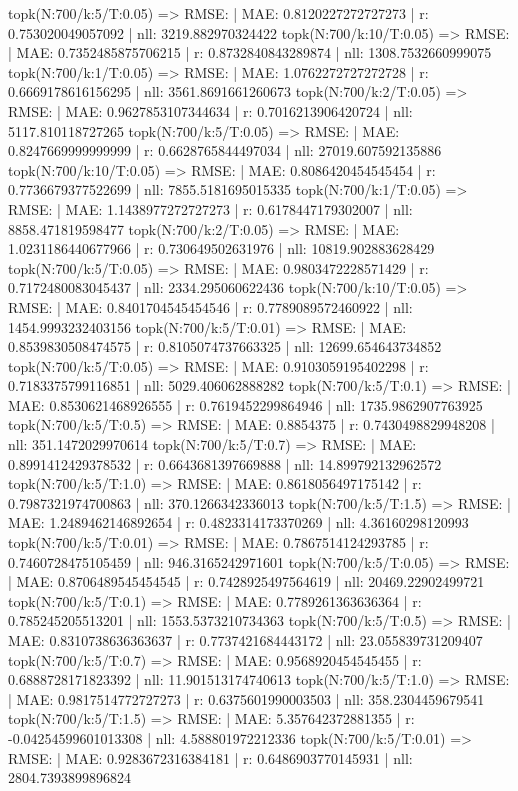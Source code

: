 topk(N:700/k:5/T:0.05) => RMSE: | MAE: 0.8120227272727273 | r: 0.753020049057092 | nll: 3219.882970324422
topk(N:700/k:10/T:0.05) => RMSE: | MAE: 0.7352485875706215 | r: 0.8732840843289874 | nll: 1308.7532660999075
topk(N:700/k:1/T:0.05) => RMSE: | MAE: 1.0762272727272728 | r: 0.6669178616156295 | nll: 3561.8691661260673
topk(N:700/k:2/T:0.05) => RMSE: | MAE: 0.9627853107344634 | r: 0.7016213906420724 | nll: 5117.810118727265
topk(N:700/k:5/T:0.05) => RMSE: | MAE: 0.8247669999999999 | r: 0.6628765844497034 | nll: 27019.607592135886
topk(N:700/k:10/T:0.05) => RMSE: | MAE: 0.8086420454545454 | r: 0.7736679377522699 | nll: 7855.5181695015335
topk(N:700/k:1/T:0.05) => RMSE: | MAE: 1.1438977272727273 | r: 0.6178447179302007 | nll: 8858.471819598477
topk(N:700/k:2/T:0.05) => RMSE: | MAE: 1.0231186440677966 | r: 0.730649502631976 | nll: 10819.902883628429
topk(N:700/k:5/T:0.05) => RMSE: | MAE: 0.9803472228571429 | r: 0.7172480083045437 | nll: 2334.295060622436
topk(N:700/k:10/T:0.05) => RMSE: | MAE: 0.8401704545454546 | r: 0.7789089572460922 | nll: 1454.9993232403156
topk(N:700/k:5/T:0.01) => RMSE: | MAE: 0.8539830508474575 | r: 0.8105074737663325 | nll: 12699.654643734852
topk(N:700/k:5/T:0.05) => RMSE: | MAE: 0.9103059195402298 | r: 0.7183375799116851 | nll: 5029.406062888282
topk(N:700/k:5/T:0.1) => RMSE: | MAE: 0.8530621468926555 | r: 0.7619452299864946 | nll: 1735.9862907763925
topk(N:700/k:5/T:0.5) => RMSE: | MAE: 0.8854375 | r: 0.7430498829948208 | nll: 351.1472029970614
topk(N:700/k:5/T:0.7) => RMSE: | MAE: 0.8991412429378532 | r: 0.6643681397669888 | nll: 14.899792132962572
topk(N:700/k:5/T:1.0) => RMSE: | MAE: 0.8618056497175142 | r: 0.7987321974700863 | nll: 370.1266342336013
topk(N:700/k:5/T:1.5) => RMSE: | MAE: 1.2489462146892654 | r: 0.4823314173370269 | nll: 4.36160298120993
topk(N:700/k:5/T:0.01) => RMSE: | MAE: 0.7867514124293785 | r: 0.7460728475105459 | nll: 946.3165242971601
topk(N:700/k:5/T:0.05) => RMSE: | MAE: 0.8706489545454545 | r: 0.7428925497564619 | nll: 20469.22902499721
topk(N:700/k:5/T:0.1) => RMSE: | MAE: 0.7789261363636364 | r: 0.785245205513201 | nll: 1553.5373210734363
topk(N:700/k:5/T:0.5) => RMSE: | MAE: 0.8310738636363637 | r: 0.7737421684443172 | nll: 23.055839731209407
topk(N:700/k:5/T:0.7) => RMSE: | MAE: 0.9568920454545455 | r: 0.6888728171823392 | nll: 11.901513174740613
topk(N:700/k:5/T:1.0) => RMSE: | MAE: 0.9817514772727273 | r: 0.6375601990003503 | nll: 358.2304459679541
topk(N:700/k:5/T:1.5) => RMSE: | MAE: 5.357642372881355 | r: -0.04254599601013308 | nll: 4.588801972212336
topk(N:700/k:5/T:0.01) => RMSE: | MAE: 0.9283672316384181 | r: 0.6486903770145931 | nll: 2804.7393899896824
